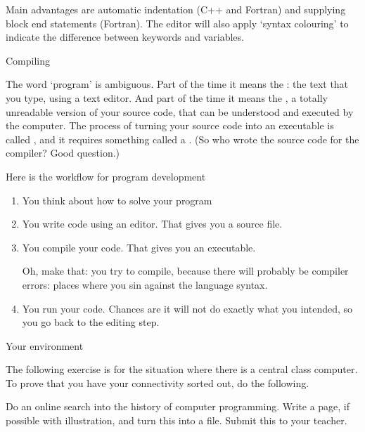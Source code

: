 Main advantages are automatic indentation (C++ and Fortran) and
supplying block end statements (Fortran). The editor will also apply
`syntax colouring' to indicate the difference between keywords and variables.

 {Compiling}

The word `program' is ambiguous. Part of the time it means the
: the text that you type, using a text
editor. And part of the time it means the , a
totally unreadable version of your source code, that can be understood and
executed by the computer. The process of turning your source code into
an executable is called , and it requires
something called a . (So who wrote the source code
for the compiler? Good question.)

Here is the workflow for program development
\begin{enumerate}
\item You think about how to solve your program
\item You write code using an editor. That gives you a source file.
\item You compile your code. That gives you an executable.

  Oh, make that: you try to compile,
  because there will probably be compiler errors: places where you
  sin against the language syntax.
\item You run your code. Chances are it will not do exactly what you
  intended, so you go back to the editing step.
\end{enumerate}

 {Your environment}

The following exercise is for the situation where there is a
central class computer.
To prove that you have your connectivity sorted out, do the following.

\begin{exercise}
  \label{ex:ssh-scp}
  Do an online search into the history of computer programming.
  Write a page, if possible with illustration, and turn this into a
   file. Submit this to your teacher.
\end{exercise}
